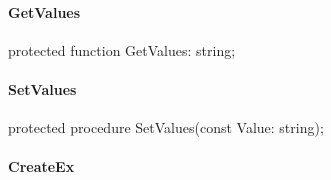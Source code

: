 \documentclass{report}
\newif\ifpdf
\begin{document}
\paragraph*{GetValues}\hspace*{\fill}

\label{PasDoc_OptionParser.TSetOption-GetValues}
\begin{list}{}{
\setlength{\itemindent}{0cm}
\setlength{\listparindent}{0cm}
\setlength{\leftmargin}{\evensidemargin}
\addtolength{\leftmargin}{\tmplength}
\settowidth{\labelsep}{X}
\addtolength{\leftmargin}{\labelsep}
\setlength{\labelwidth}{\tmplength}
}
\item[\textbf{Declaration}\hfill]
\ifpdf
\begin{flushleft}
\fi
\begin{ttfamily}
protected function GetValues: string;\end{ttfamily}

\ifpdf
\end{flushleft}
\fi

\end{list}
\paragraph*{SetValues}\hspace*{\fill}

\label{PasDoc_OptionParser.TSetOption-SetValues}
\begin{list}{}{
\setlength{\itemindent}{0cm}
\setlength{\listparindent}{0cm}
\setlength{\leftmargin}{\evensidemargin}
\addtolength{\leftmargin}{\tmplength}
\settowidth{\labelsep}{X}
\addtolength{\leftmargin}{\labelsep}
\setlength{\labelwidth}{\tmplength}
}
\item[\textbf{Declaration}\hfill]
\ifpdf
\begin{flushleft}
\fi
\begin{ttfamily}
protected procedure SetValues(const Value: string);\end{ttfamily}

\ifpdf
\end{flushleft}
\fi

\end{list}
\paragraph*{CreateEx}\hspace*{\fill}
\end{document}
